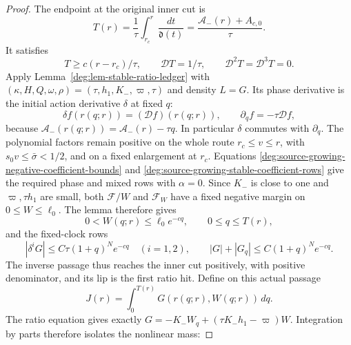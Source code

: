 \begin{proof}
The endpoint at the original inner cut is
\begin{equation}
 T(r)=\frac1\tau\int_{r_c}^r\frac{dt}{\mathfrak d(t)}
     =\frac{\mathcal A_-(r)+A_{c,0}}{\tau}.
 \label{deg:source-growing-inward-terminal}
\end{equation}
It satisfies
\begin{equation}
 T\ge c(r-r_c)/\tau,\qquad
 \mathcal DT=1/\tau,\qquad
 \mathcal D^2T=\mathcal D^3T=0 .
 \label{deg:source-growing-inward-terminal-action-rows}
\end{equation}
Apply Lemma~\ref{deg:lem-stable-ratio-ledger} with
\((\kappa,H,Q,\omega,\rho)=(\tau,h_1,K_-,\varpi,\tau)\)
and density \(L=G\). Its phase derivative is the initial action
derivative \(\delta\) at fixed \(q\):
\begin{equation}\label{deg:source-growing-initial-action-flow}
 \delta f(r(q;r))=(\mathcal Df)(r(q;r)),\qquad
 \partial_q f=-\tau\mathcal Df,
\end{equation}
because \(\mathcal A_-(r(q;r))=\mathcal A_-(r)-\tau q\).
In particular \(\delta\) commutes with \(\partial_q\).
The polynomial factors remain positive on the whole route
\(r_c\le v\le r\), with \(s_0v\le\bar\sigma<1/2\), and on
a fixed enlargement at \(r_c\). Equations
\eqref{deg:source-growing-negative-coefficient-bounds} and
\eqref{deg:source-growing-stable-coefficient-rows} give the required
phase and mixed rows with \(\alpha=0\). Since \(K_-\) is close
to one and \(\varpi,\tau h_1\) are small, both
\(\mathcal F/W\) and \(\mathcal F_W\) have a fixed negative
margin on \(0\le W\le\ell_0\). The lemma therefore gives
\begin{equation}\label{deg:source-growing-stable-ratio-corridor}
 0<W(q;r)\le\ell_0e^{-cq},\qquad 0\le q\le T(r),
\end{equation}
and the fixed-clock rows
\begin{equation}
 |\delta^iG|\le C\tau(1+q)^Ne^{-cq}\quad(i=1,2),
 \qquad |G|+|G_q|\le C(1+q)^Ne^{-cq}.
 \label{deg:source-growing-stable-kernel-rows}
\end{equation}
The inverse passage thus reaches the inner cut positively, with positive
denominator, and its lip is the first ratio hit.
Define on this actual passage
\begin{equation}
 J(r)=\int_0^{T(r)}G(r(q;r),W(q;r))\,dq .
 \label{deg:source-growing-nonlinear-action-integral}
\end{equation}
The ratio equation gives exactly
\(G=-K_-W_q+(\tau K_-h_1-\varpi)W\). Integration by parts
therefore isolates the nonlinear mass:

\end{proof}
